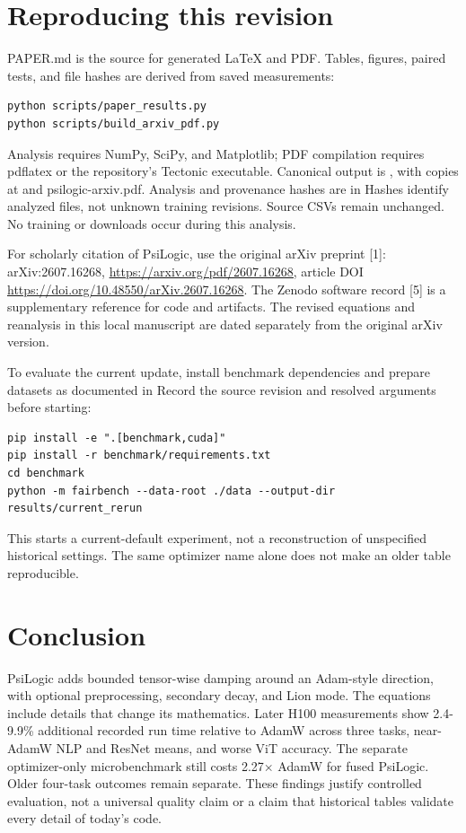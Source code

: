 \documentclass[11pt,a4paper]{article}
\begin{document}
\section{Reproducing this revision}

PAPER.md is the source for generated LaTeX and PDF. Tables, figures, paired tests, and file hashes are derived from saved measurements:

\begin{Verbatim}[fontsize=\small]
python scripts/paper_results.py
python scripts/build_arxiv_pdf.py
\end{Verbatim}

Analysis requires NumPy, SciPy, and Matplotlib; PDF compilation requires pdflatex or the repository's Tectonic executable. Canonical output is , with copies at  and psilogic-arxiv.pdf. Analysis and provenance hashes are in  Hashes identify analyzed files, not unknown training revisions. Source CSVs remain unchanged. No training or downloads occur during this analysis.

For scholarly citation of PsiLogic, use the original arXiv preprint [1]: arXiv:2607.16268, \url{https://arxiv.org/pdf/2607.16268,} article DOI \url{https://doi.org/10.48550/arXiv.2607.16268}. The Zenodo software record [5] is a supplementary reference for code and artifacts. The revised equations and reanalysis in this local manuscript are dated separately from the original arXiv version.

To evaluate the current update, install benchmark dependencies and prepare datasets as documented in  Record the source revision and resolved arguments before starting:

\begin{Verbatim}[fontsize=\small]
pip install -e ".[benchmark,cuda]"
pip install -r benchmark/requirements.txt
cd benchmark
python -m fairbench --data-root ./data --output-dir results/current_rerun
\end{Verbatim}

This starts a current-default experiment, not a reconstruction of unspecified historical settings. The same optimizer name alone does not make an older table reproducible.

\section{Conclusion}

PsiLogic adds bounded tensor-wise damping around an Adam-style direction, with optional preprocessing, secondary decay, and Lion mode. The equations include details that change its mathematics. Later H100 measurements show 2.4-9.9\% additional recorded run time relative to AdamW across three tasks, near-AdamW NLP and ResNet means, and worse ViT accuracy. The separate optimizer-only microbenchmark still costs 2.27\(\times\) AdamW for fused PsiLogic. Older four-task outcomes remain separate. These findings justify controlled evaluation, not a universal quality claim or a claim that historical tables validate every detail of today's code.
\end{document}

